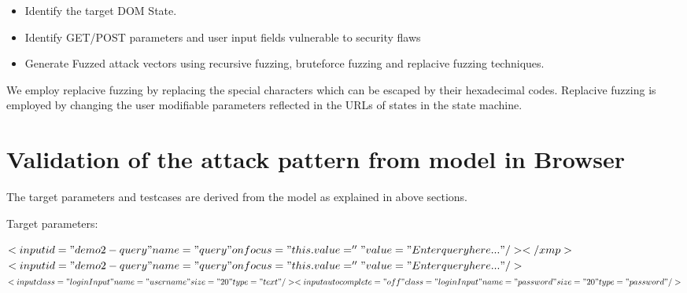\begin{itemize}
\item Identify the target DOM State.
\item Identify GET/POST parameters and user input fields vulnerable to security flaws
\item Generate Fuzzed attack vectors using recursive fuzzing, bruteforce fuzzing and replacive fuzzing techniques.
\end{itemize} 

We employ replacive fuzzing by replacing the special characters which can be escaped by their hexadecimal codes. Replacive fuzzing is employed by changing the user modifiable parameters reflected in the URLs of states in the state machine.

\section{Validation of the attack pattern from model in Browser}

 The target parameters and testcases are derived from the model as explained in above sections. 

Target parameters:

$
<input id="demo2-query" name="query" onfocus="this.value=''" value="Enter query here..."/></xmp>$\\
$<input id="demo2-query" name="query" onfocus="this.value=''" value="Enter query here..."/>$
\\
$
<input class="loginInput" name="username" size="20" type="text"/>
<input autocomplete="off" class="loginInput" name="password" size="20" type="password"/>
$
 
